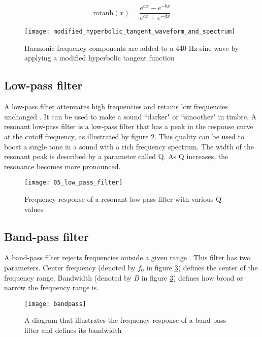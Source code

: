 $$\text{mtanh}(x)=\frac{e^{ax}-e^{-bx}}{e^{cx}+e^{-dx}}$$

\begin{figure}[H]
    \centering
    \texttt{[image: modified\_hyperbolic\_tangent\_waveform\_and\_spectrum]}
    \caption{Harmonic frequency components are added to a 440 Hz sine wave by applying a modified hyperbolic tangent function}
    \label{fig:modified_hyperbolic_tangent_waveform_and_spectrum}
\end{figure}

\subsection{Low-pass filter}
A low-pass filter attenuates high frequencies and retains low frequencies unchanged \citep{dodge_jerse_1997}. It can be used to make a sound ``darker" or ``smoother" in timbre. A resonant low-pass filter is a low-pass filter that has a peak in the response curve at the cutoff frequency, as illustrated by figure \ref{fig:low_pass_filter}. This quality can be used to boost a single tone in a sound with a rich frequency spectrum. The width of the resonant peak is described by a parameter called Q. As Q increases, the resonance becomes more pronounced.

\begin{figure}[H]
    \centering
    \texttt{[image: 05\_low\_pass\_filter]}
    \caption{Frequency response of a resonant low-pass filter with various Q values}
    \label{fig:low_pass_filter}
\end{figure}

\subsection{Band-pass filter}
A band-pass filter rejects frequencies outside a given range \citep{dodge_jerse_1997}. This filter has two parameters. Center frequency (denoted by $f_0$ in figure \ref{fig:bandpass}) defines the center of the frequency range. Bandwidth (denoted by $B$ in figure \ref{fig:bandpass}) defines how broad or narrow the frequency range is.

\begin{figure}[H]
    \centering
    \texttt{[image: bandpass]}
    \caption{A diagram that illustrates the frequency response of a band-pass filter and defines its bandwidth}
    \label{fig:bandpass}
\end{figure}

